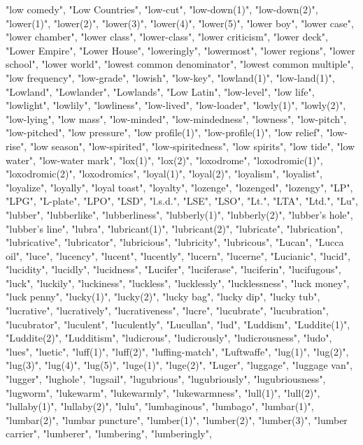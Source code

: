 "low comedy",
"Low Countries",
"low-cut",
"low-down(1)",
"low-down(2)",
"lower(1)",
"lower(2)",
"lower(3)",
"lower(4)",
"lower(5)",
"lower boy",
"lower case",
"lower chamber",
"lower class",
"lower-class",
"lower criticism",
"lower deck",
"Lower Empire",
"Lower House",
"loweringly",
"lowermost",
"lower regions",
"lower school",
"lower world",
"lowest common denominator",
"lowest common multiple",
"low frequency",
"low-grade",
"lowish",
"low-key",
"lowland(1)",
"low-land(1)",
"Lowland",
"Lowlander",
"Lowlands",
"Low Latin",
"low-level",
"low life",
"lowlight",
"lowlily",
"lowliness",
"low-lived",
"low-loader",
"lowly(1)",
"lowly(2)",
"low-lying",
"low mass",
"low-minded",
"low-mindedness",
"lowness",
"low-pitch",
"low-pitched",
"low pressure",
"low profile(1)",
"low-profile(1)",
"low relief",
"low-rise",
"low season",
"low-spirited",
"low-spiritedness",
"low spirits",
"low tide",
"low water",
"low-water mark",
"lox(1)",
"lox(2)",
"loxodrome",
"loxodromic(1)",
"loxodromic(2)",
"loxodromics",
"loyal(1)",
"loyal(2)",
"loyalism",
"loyalist",
"loyalize",
"loyally",
"loyal toast",
"loyalty",
"lozenge",
"lozenged",
"lozengy",
"LP",
"LPG",
"L-plate",
"LPO",
"LSD",
"l.s.d.",
"LSE",
"LSO",
"Lt.",
"LTA",
"Ltd.",
"Lu",
"lubber",
"lubberlike",
"lubberliness",
"lubberly(1)",
"lubberly(2)",
"lubber's hole",
"lubber's line",
"lubra",
"lubricant(1)",
"lubricant(2)",
"lubricate",
"lubrication",
"lubricative",
"lubricator",
"lubricious",
"lubricity",
"lubricous",
"Lucan",
"Lucca oil",
"luce",
"lucency",
"lucent",
"lucently",
"lucern",
"lucerne",
"Lucianic",
"lucid",
"lucidity",
"lucidly",
"lucidness",
"Lucifer",
"luciferase",
"luciferin",
"lucifugous",
"luck",
"luckily",
"luckiness",
"luckless",
"lucklessly",
"lucklessness",
"luck money",
"luck penny",
"lucky(1)",
"lucky(2)",
"lucky bag",
"lucky dip",
"lucky tub",
"lucrative",
"lucratively",
"lucrativeness",
"lucre",
"lucubrate",
"lucubration",
"lucubrator",
"luculent",
"luculently",
"Lucullan",
"lud",
"Luddism",
"Luddite(1)",
"Luddite(2)",
"Ludditism",
"ludicrous",
"ludicrously",
"ludicrousness",
"ludo",
"lues",
"luetic",
"luff(1)",
"luff(2)",
"luffing-match",
"Luftwaffe",
"lug(1)",
"lug(2)",
"lug(3)",
"lug(4)",
"lug(5)",
"luge(1)",
"luge(2)",
"Luger",
"luggage",
"luggage van",
"lugger",
"lughole",
"lugsail",
"lugubrious",
"lugubriously",
"lugubriousness",
"lugworm",
"lukewarm",
"lukewarmly",
"lukewarmness",
"lull(1)",
"lull(2)",
"lullaby(1)",
"lullaby(2)",
"lulu",
"lumbaginous",
"lumbago",
"lumbar(1)",
"lumbar(2)",
"lumbar puncture",
"lumber(1)",
"lumber(2)",
"lumber(3)",
"lumber carrier",
"lumberer",
"lumbering",
"lumberingly",
